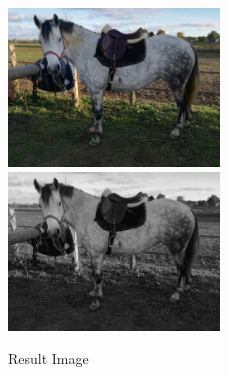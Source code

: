 \documentclass{article}
\begin{document}
\begin{figure}[h]
\centering
\includegraphics[width=0.5\textwidth]{./labwork/data/dada.jpg}
\includegraphics[width=0.5\textwidth]{./labwork7-gpu-out.jpg}
\caption{Result Image}
\end{figure}
\end{document}
